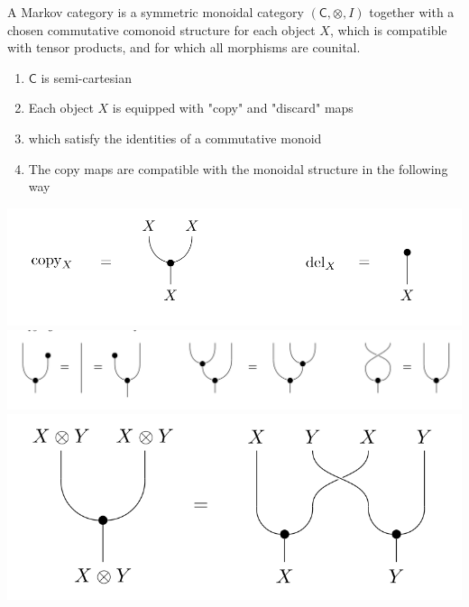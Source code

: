\begin{frame}
    \begin{definition}
        A Markov category is a symmetric monoidal category $(\mathsf{C}, \otimes, I)$ together with a chosen commutative comonoid structure for each object $X$, which is compatible with tensor products, and for which all morphisms are counital.
    \end{definition}\pause
    \begin{minipage}{.48\textwidth}
        \begin{enumerate}
            \item $\mathsf{C}$ is semi-cartesian
            \item Each object $X$ is equipped with "copy" and "discard" maps
            \item which satisfy the identities of a commutative monoid
            \item The copy maps are compatible with the monoidal structure in the following way
        \end{enumerate}
    \end{minipage}
    \hfill
    \begin{minipage}{.48\textwidth}
        \includegraphics[width=\textwidth]{graphics/string/markov_copy_delete.png}
        \includegraphics[width=\textwidth]{graphics/string/markov_commutative_monoid.png}
        \includegraphics[width=\textwidth]{graphics/string/markov_monoidal_compat.png}
    \end{minipage}
\end{frame}

